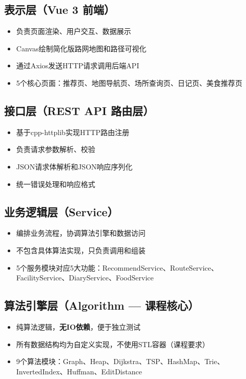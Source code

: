 \documentclass[12pt,a4paper]{report}
\begin{document}
\subsection{表示层（Vue 3 前端）}

\begin{itemize}
    \item 负责页面渲染、用户交互、数据展示
    \item Canvas绘制简化版路网地图和路径可视化
    \item 通过Axios发送HTTP请求调用后端API
    \item 5个核心页面：推荐页、地图导航页、场所查询页、日记页、美食推荐页
\end{itemize}

\subsection{接口层（REST API 路由层）}

\begin{itemize}
    \item 基于cpp-httplib实现HTTP路由注册
    \item 负责请求参数解析、校验
    \item JSON请求体解析和JSON响应序列化
    \item 统一错误处理和响应格式
\end{itemize}

\subsection{业务逻辑层（Service）}

\begin{itemize}
    \item 编排业务流程，协调算法引擎和数据访问
    \item 不包含具体算法实现，只负责调用和组装
    \item 5个服务模块对应5大功能：RecommendService、RouteService、FacilityService、DiaryService、FoodService
\end{itemize}

\subsection{算法引擎层（Algorithm --- 课程核心）}

\begin{itemize}
    \item 纯算法逻辑，\textbf{无IO依赖}，便于独立测试
    \item 所有数据结构均为自定义实现，不使用STL容器（课程要求）
    \item 9个算法模块：Graph、Heap、Dijkstra、TSP、HashMap、Trie、InvertedIndex、Huffman、EditDistance
\end{itemize}
\end{document}
